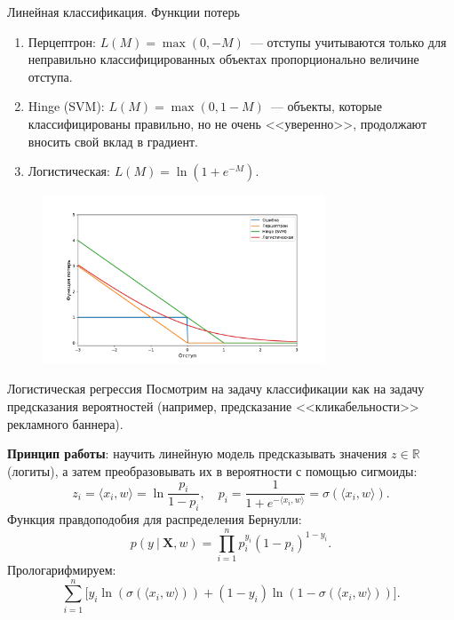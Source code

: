 \documentclass[notheorems, handout]{beamer}
\begin{document}
\begin{frame}{Линейная классификация. Функции потерь}
	\begin{enumerate}
		\item Перцептрон: $L(M) = \max(0, -M)$~--- отступы учитываются только для неправильно классифицированных объектах пропорционально величине отступа.
		\item Hinge (SVM): $L(M) = \max(0, 1-M)$~--- объекты, которые классифицированы правильно, но не очень <<уверенно>>, продолжают вносить свой вклад в градиент.
		\item Логистическая: $L(M) = \ln\left(1+e^{-M}\right)$.
	\end{enumerate}
	\begin{figure}
		\includegraphics[width=0.75\textwidth]{img/loss_major.pdf}
	\end{figure}
\end{frame}

\begin{frame}{Логистическая регрессия}
	Посмотрим на задачу классификации как на задачу предсказания вероятностей (например, предсказание <<кликабельности>> рекламного баннера).

	\textbf{Принцип работы}: научить линейную модель предсказывать значения $z\in\mathbb{R}$ (логиты), а затем преобразовывать их в вероятности с помощью сигмоиды:
	\[
		z_i=\langle x_i, w\rangle = \ln\frac{p_i}{1 - p_i},\quad p_i = \frac{1}{1+e^{-\langle x_i, w\rangle}}=\sigma(\langle x_i, w\rangle).
	\]
	Функция правдоподобия для распределения Бернулли:
	\[
		p(y~|~\mathbf{X}, w)=\prod_{i=1}^np_i^{y_i}(1-p_i)^{1-y_i}.
	\]
	Прологарифмируем:
	\[
		\sum_{i=1}^n\Big[y_i\ln(\sigma(\langle x_i, w\rangle)) + (1-y_i)\ln(1-\sigma(\langle x_i, w\rangle))\Big].
	\]
\end{frame}
\end{document}
